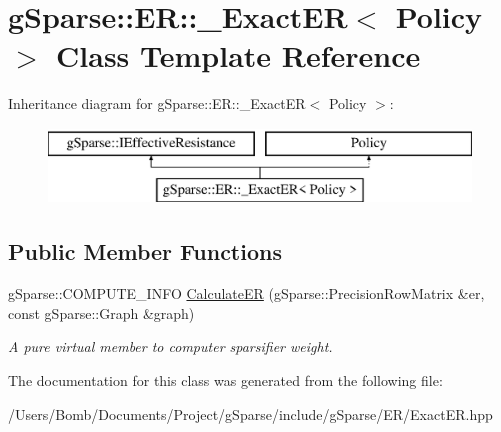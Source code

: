 \hypertarget{classg_sparse_1_1_e_r_1_1___exact_e_r}{}\section{g\+Sparse\+:\+:ER\+:\+:\+\_\+\+Exact\+ER$<$ Policy $>$ Class Template Reference}
\label{classg_sparse_1_1_e_r_1_1___exact_e_r}
Inheritance diagram for g\+Sparse\+:\+:ER\+:\+:\+\_\+\+Exact\+ER$<$ Policy $>$\+:\begin{figure}[H]
\begin{center}
\leavevmode
\includegraphics[height=2.000000cm]{classg_sparse_1_1_e_r_1_1___exact_e_r}
\end{center}
\end{figure}
\subsection*{Public Member Functions}
\begin{DoxyCompactItemize}
\item 
\mbox{\label{classg_sparse_1_1_e_r_1_1___exact_e_r_a47b950a81c815626a9d51a6284d1d49d}} 
g\+Sparse\+::\+C\+O\+M\+P\+U\+T\+E\+\_\+\+I\+N\+FO \mbox{\hyperlink{classg_sparse_1_1_e_r_1_1___exact_e_r_a47b950a81c815626a9d51a6284d1d49d}{Calculate\+ER}} (g\+Sparse\+::\+Precision\+Row\+Matrix \&er, const g\+Sparse\+::\+Graph \&graph)
\begin{DoxyCompactList}\small\item\em A pure virtual member to computer sparsifier weight. \end{DoxyCompactList}\end{DoxyCompactItemize}


The documentation for this class was generated from the following file\+:\begin{DoxyCompactItemize}
\item 
/\+Users/\+Bomb/\+Documents/\+Project/g\+Sparse/include/g\+Sparse/\+E\+R/Exact\+E\+R.\+hpp\end{DoxyCompactItemize}
